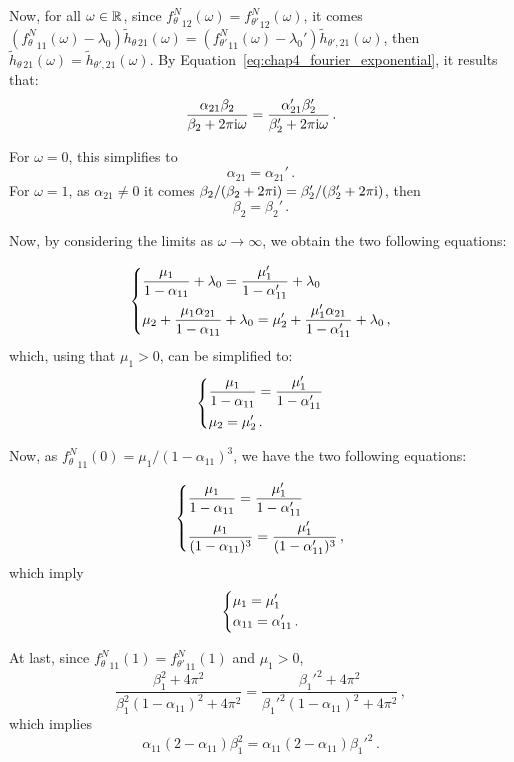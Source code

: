 \begin{subappendices}
Now, for all $\omega \in {\mathbb R}$, since ${f_\theta^N}_{12}(\omega) = {f_{\theta'}^N}_{12}(\omega)$, it comes $({f_\theta^N}_{11}(\omega) - \lambda_0)\tilde h_{\theta \, 21}(\omega) = ({f_{\theta'}^N}_{11}(\omega) - \lambda_0')\tilde h_{\theta', 21}(\omega)$, then $\tilde h_{\theta \, 21}(\omega) = \tilde h_{\theta', 21}(\omega)$.
By Equation~\eqref{eq:chap4_fourier_exponential}, it results that: 
\[
\frac{\alpha_{21} \beta_2}{\beta_2 + 2 \pi \mathrm{i} \omega} = \frac{\alpha_{21}' \beta_2'}{\beta_2' + 2 \pi \mathrm{i} \omega}\,.
\]

For $\omega = 0$, this simplifies to \[\alpha_{21} = \alpha_{21}'\,.\]
For $\omega = 1$, as $\alpha_{21} \neq 0$ it comes
${\beta_2}/(\beta_2 + 2 \pi \mathrm{i}) = {\beta_2'}/(\beta_2' + 2 \pi \mathrm{i})$, then
\[
\beta_2 = \beta_2' \,.
\]

Now, by considering the limits as $\omega \to \infty$, we obtain the two following equations:

\[\begin{dcases}
\frac{\mu_1}{1-\alpha_{11}} + \lambda_0 = \frac{\mu_1'}{1-\alpha_{11}'} + \lambda_0\\
\mu_2 + \frac{\mu_1 \alpha_{21}}{1-\alpha_{11}} + \lambda_0 = \mu_2' + \frac{\mu_1' \alpha_{21}}{1-\alpha_{11}'} + \lambda_0\,,
\end{dcases}
\]
which, using that $\mu_1 > 0$, can be simplified to:
\[
\begin{dcases}
\frac{\mu_1}{1-\alpha_{11}}= \frac{\mu_1'}{1-\alpha_{11}'}\\
\mu_2 = \mu_2'\,. 
\end{dcases}
\]

Now, as ${f_\theta^N}_{11}(0) = {\mu_1}/{(1-\alpha_{11})^3}$, we have the two following equations:

\[\begin{dcases}
\frac{\mu_1}{1-\alpha_{11}}= \frac{\mu_1'}{1-\alpha_{11}'}\\
\frac{\mu_1}{(1-\alpha_{11})^3} = \frac{\mu_1'}{(1-\alpha_{11}')^3} \,,
\end{dcases}
\]
which imply
\[
\begin{dcases}
\mu_1 = \mu_1'\\
\alpha_{11} = \alpha_{11}'\,.
\end{dcases}
\]

At last, since ${f_\theta^N}_{11}(1) = {f_{\theta'}^N}_{11}(1)$ and $\mu_1 > 0$,
\[
\frac{\beta_1^2 + 4 \pi^2}{\beta_1^2(1-\alpha_{11})^2 + 4\pi^2}
=
\frac{{\beta_1'}^2 + 4 \pi^2}{{\beta_1'}^2(1-\alpha_{11})^2 + 4\pi^2} \,,
\]
which implies
\[
\alpha_{11}(2 - \alpha_{11}) \beta_1^2
=
\alpha_{11}(2 - \alpha_{11}) {\beta_1'}^2 \,.
\]


\end{subappendices}
